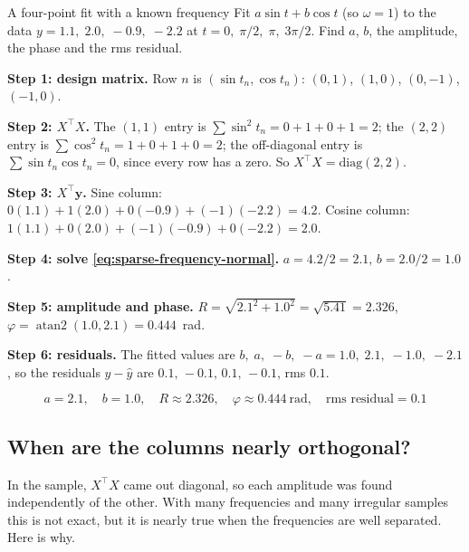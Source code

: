 \begin{sample}{A four-point fit with a known frequency}
Fit $a\sin t+b\cos t$ (so $\omega=1$) to the data $y=1.1,\;2.0,\;-0.9,\;-2.2$ at $t=0,\;\pi/2,\;\pi,\;3\pi/2$. Find $a$, $b$, the amplitude, the phase and the rms residual.

\textbf{Step 1: design matrix.} Row $n$ is $(\sin t_n,\cos t_n)$: $(0,1)$, $(1,0)$, $(0,-1)$, $(-1,0)$.

\textbf{Step 2: $X^\top X$.} The $(1,1)$ entry is $\sum\sin^2t_n=0+1+0+1=2$; the $(2,2)$ entry is $\sum\cos^2t_n=1+0+1+0=2$; the off-diagonal entry is $\sum\sin t_n\cos t_n=0$, since every row has a zero. So $X^\top X=\mathrm{diag}(2,2)$.

\textbf{Step 3: $X^\top\bm y$.} Sine column: $0(1.1)+1(2.0)+0(-0.9)+(-1)(-2.2)=4.2$. Cosine column: $1(1.1)+0(2.0)+(-1)(-0.9)+0(-2.2)=2.0$.

\textbf{Step 4: solve \eqref{eq:sparse-frequency-normal}.} $a=4.2/2=2.1$, $b=2.0/2=1.0$.

\textbf{Step 5: amplitude and phase.} $R=\sqrt{2.1^2+1.0^2}=\sqrt{5.41}=2.326$, $\varphi=\operatorname{atan2}(1.0,2.1)=0.444$~rad.

\textbf{Step 6: residuals.} The fitted values are $b,\;a,\;-b,\;-a=1.0,\;2.1,\;-1.0,\;-2.1$, so the residuals $y-\hat y$ are $0.1,\,-0.1,\,0.1,\,-0.1$, rms $0.1$.

$$\boxed{a=2.1,\quad b=1.0,\quad R\approx2.326,\quad \varphi\approx0.444\ \text{rad},\quad \text{rms residual}=0.1}$$
\end{sample}

\subsection{When are the columns nearly orthogonal?}

In the sample, $X^\top X$ came out diagonal, so each amplitude was found independently of the other. With many frequencies and many irregular samples this is not exact, but it is nearly true when the frequencies are well separated. Here is why.

